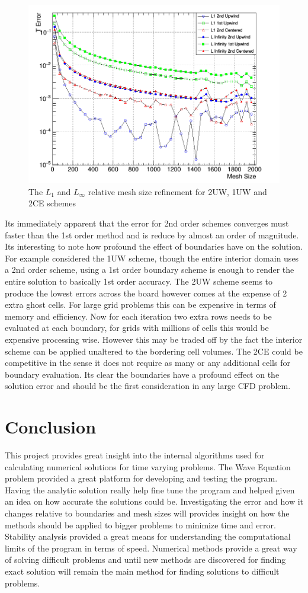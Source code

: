 \documentclass[paper=a4, fontsize=11pt, abstract=on]{scrartcl}
\numberwithin{equation}{section}		%
\numberwithin{figure}{section}			%
\numberwithin{table}{section}				%
\begin{document}
\begin{figure}[H]
\centering
\includegraphics[width=0.75\linewidth]{3a33}
\caption{The $L_1$ and $L_{\infty}$ relative mesh size refinement for 2UW, 1UW and 2CE schemes}
\label{3a3}
\end{figure}

Its immediately apparent that the error for 2nd order schemes converges must faster than the 1st order method and is reduce by almost an order of magnitude. Its interesting to note how profound the effect of boundaries have on the solution. For example considered the 1UW scheme, though the entire interior domain uses a 2nd order scheme, using a 1st order boundary scheme is enough to render the entire solution to basically 1st order accuracy. The 2UW scheme seems to produce the lowest errors across the board however comes at the expense of 2 extra ghost cells. For large grid problems this can be expensive in terms of memory and efficiency. Now for each iteration two extra rows needs to be evaluated at each boundary, for grids with millions of cells this would be expensive processing wise. However this may be traded off by the fact the interior scheme can be applied unaltered to the bordering cell volumes. The 2CE could be competitive in the sense it does not require as many or any additional cells for boundary evaluation. Its clear the boundaries have a profound effect on the solution error and should be the first consideration in any large CFD problem.

\section{Conclusion}
This project provides great insight into the internal algorithms used for calculating numerical solutions for time varying problems. The Wave Equation problem provided a great platform for developing and testing the program. Having the analytic solution really help fine tune the program and helped given an idea on how accurate the solutions could be. Investigating the error and how it changes relative to boundaries and mesh sizes will provides insight on how the methods should be applied to bigger problems to minimize time and error. Stability analysis provided a great means for understanding the computational limits of the program in terms of speed. Numerical methods provide a great way of solving difficult problems and until new methods are discovered for finding exact solution will remain the main method for finding solutions to difficult problems. 
\end{document}
